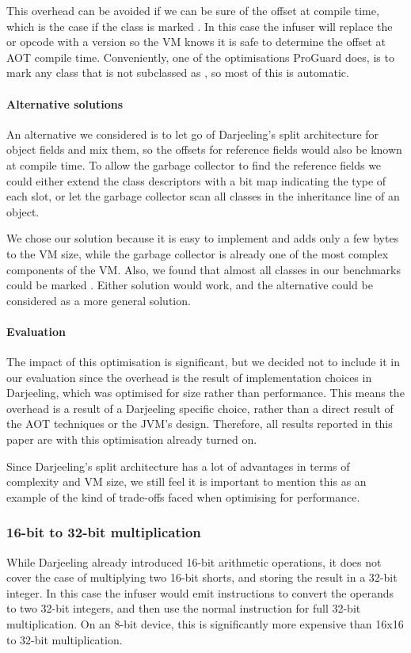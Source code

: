 This overhead can be avoided if we can be sure of the offset at compile time, which is the case if the class is marked . In this case the infuser will replace the  or  opcode with a  version so the VM knows it is safe to determine the offset at AOT compile time. Conveniently, one of the optimisations ProGuard does, is to mark any class that is not subclassed as , so most of this is automatic.

\paragraph{Alternative solutions} An alternative we considered is to let go of Darjeeling's split architecture for object fields and mix them, so the offsets for reference fields would also be known at compile time. To allow the garbage collector to find the reference fields we could either extend the class descriptors with a bit map indicating the type of each slot, or let the garbage collector scan all classes in the inheritance line of an object.

We chose our solution because it is easy to implement and adds only a few bytes to the VM size, while the garbage collector is already one of the most complex components of the VM. Also, we found that almost all classes in our benchmarks could be marked . Either solution would work, and the alternative could be considered as a more general solution.

\paragraph{Evaluation}
The impact of this optimisation is significant, but we decided not to include it in our evaluation since the overhead is the result of implementation choices in Darjeeling, which was optimised for size rather than performance. This means the overhead is a result of a Darjeeling specific choice, rather than a direct result of the AOT techniques or the JVM's design. Therefore, all results reported in this paper are with this optimisation already turned on.

Since Darjeeling's split architecture has a lot of advantages in terms of complexity and VM size, we still feel it is important to mention this as an example of the kind of trade-offs faced when optimising for performance.

\subsubsection{ 16-bit to 32-bit multiplication}
While Darjeeling already introduced 16-bit arithmetic operations, it does not cover the case of multiplying two 16-bit shorts, and storing the result in a 32-bit integer. In this case the infuser would emit  instructions to convert the operands to two 32-bit integers, and then use the normal  instruction for full 32-bit multiplication. On an 8-bit device, this is significantly more expensive than 16x16 to 32-bit multiplication.

